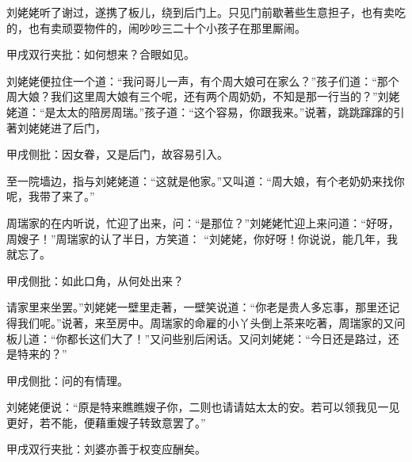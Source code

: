 \begin{parag}


    刘姥姥听了谢过，遂携了板儿，绕到后门上。只见门前歇著些生意担子，也有卖吃的，也有卖顽耍物件的，闹吵吵三二十个小孩子在那里厮闹。\begin{note}甲戌双行夹批：如何想来？合眼如见。\end{note}刘姥姥便拉住一个道：“我问哥儿一声，有个周大娘可在家么？”孩子们道：“那个周大娘？我们这里周大娘有三个呢，还有两个周奶奶，不知是那一行当的？”刘姥姥道：“是太太的陪房周瑞。”孩子道：“这个容易，你跟我来。”说著，跳跳蹿蹿的引著刘姥姥进了后门，\begin{note}甲戌侧批：因女眷，又是后门，故容易引入。\end{note}至一院墙边，指与刘姥姥道：“这就是他家。”又叫道：“周大娘，有个老奶奶来找你呢，我带了来了。”
\end{parag}


\begin{parag}


    周瑞家的在内听说，忙迎了出来，问：“是那位？”刘姥姥忙迎上来问道：“好呀，周嫂子！”周瑞家的认了半日，方笑道： “刘姥姥，你好呀！你说说，能几年，我就忘了。\begin{note}甲戌侧批：如此口角，从何处出来？\end{note}请家里来坐罢。”刘姥姥一壁里走著，一壁笑说道：“你老是贵人多忘事，那里还记得我们呢。”说著，来至房中。周瑞家的命雇的小丫头倒上茶来吃著，周瑞家的又问板儿道：“你都长这们大了！”又问些别后闲话。又问刘姥姥：“今日还是路过，还是特来的？”\begin{note}甲戌侧批：问的有情理。\end{note}刘姥姥便说：“原是特来瞧瞧嫂子你，二则也请请姑太太的安。若可以领我见一见更好，若不能，便藉重嫂子转致意罢了。”\begin{note}甲戌双行夹批：刘婆亦善于权变应酬矣。\end{note}
\end{parag}


